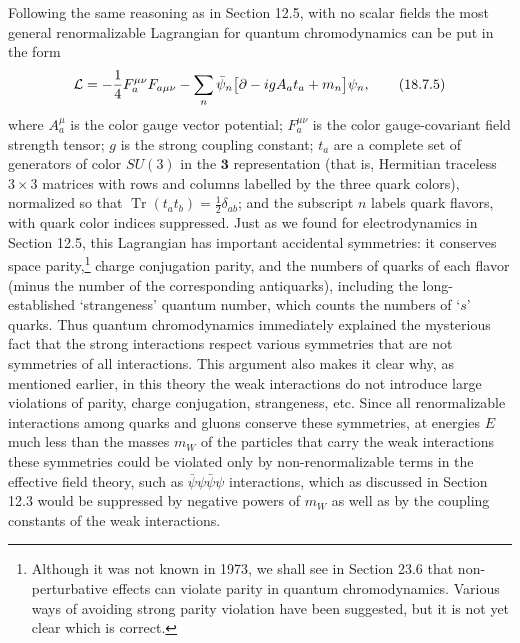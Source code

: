 Following the same reasoning as in Section 12.5, with no scalar fields the most general renormalizable Lagrangian for quantum chromodynamics can be put in the form
\begin{equation}
\mathcal{L}=-\frac{1}{4}F^{\mu\nu}_{a}F_{a\mu\nu}
-\sum_n\bar\psi_n\bigl[\sl{\partial}-ig\sl{A}_a t_a+m_n\bigr]\psi_n,
\tag{18.7.5}\label{eq:18.7.5}
\end{equation}
where $A^\mu_a$ is the color gauge vector potential; $F^{\mu\nu}_a$ is the color gauge-covariant field strength tensor; $g$ is the strong coupling constant; $t_a$ are a complete set of generators of color $SU(3)$ in the $\mathbf{3}$ representation (that is, Hermitian traceless $3\times3$ matrices with rows and columns labelled by the three quark colors), normalized so that $\operatorname{Tr}(t_a t_b)=\frac{1}{2}\delta_{ab}$; and the subscript $n$ labels quark flavors, with quark color indices suppressed. Just as we found for electrodynamics in Section 12.5, this Lagrangian has important accidental symmetries: it conserves space parity,\footnote{Although it was not known in 1973, we shall see in Section 23.6 that non-perturbative effects can violate parity in quantum chromodynamics. Various ways of avoiding strong parity violation have been suggested, but it is not yet clear which is correct.} charge conjugation parity, and the numbers of quarks of each flavor (minus the number of the corresponding antiquarks), including the long-established `strangeness' quantum number, which counts the numbers of `$s$' quarks. Thus quantum chromodynamics immediately explained the mysterious fact that the strong interactions respect various symmetries that are not symmetries of all interactions. This argument also makes it clear why, as mentioned earlier, in this theory the weak interactions do not introduce large violations of parity, charge conjugation, strangeness, etc. Since all renormalizable interactions among quarks and gluons conserve these symmetries, at energies $E$ much less than the masses $m_W$ of the particles that carry the weak interactions these symmetries could be violated only by non-renormalizable terms in the effective field theory, such as $\bar\psi\psi\bar\psi\psi$ interactions, which as discussed in Section 12.3 would be suppressed by negative powers of $m_W$ as well as by the coupling constants of the weak interactions.

